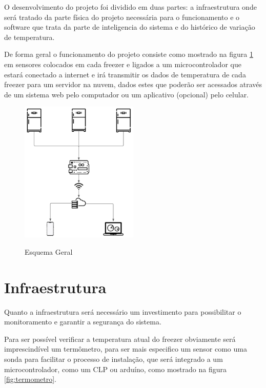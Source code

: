 \documentclass[hidelinks, 12pt, a4paper, brazil, oneside]{abntex2}
\begin{document}
    O desenvolvimento do projeto foi dividido 
    em duas partes: a infraestrutura onde
    será tratado da parte física do projeto 
    necessária para o funcionamento 
    e o software que trata da parte de inteligencia
    do sistema e do histórico de variação de temperatura.

    De forma geral o funcionamento do projeto consiste
    como mostrado na figura \ref{fig:esquemaGeral}
    em sensores colocados em cada freezer e ligados 
    a um microcontrolador que estará conectado a internet
    e irá transmitir os dados de temperatura de cada 
    freezer para um servidor na nuvem, dados estes que poderão
    ser acessados através de um sistema web pelo computador
    ou um aplicativo (opcional) pelo celular.

    \begin{figure}[ht]
        \caption{Esquema Geral}
        \centering
        \includegraphics[width=0.5\textwidth]{img/esquema_geral.png}
        \label{fig:esquemaGeral}
    \end{figure}

\section{Infraestrutura}

    Quanto a infraestrutura será necessário um 
    investimento para possibilitar o monitoramento
    e garantir a segurança do sistema.

    Para ser possível verificar a temperatura atual do 
    freezer obviamente será imprescindível um termômetro,
    para ser mais especifico um sensor como uma sonda para facilitar
    o processo de instalação, que será integrado
    a um microcontrolador, como um CLP ou arduíno, 
    como mostrado na figura \ref{fig:termometro}.
\end{document}
